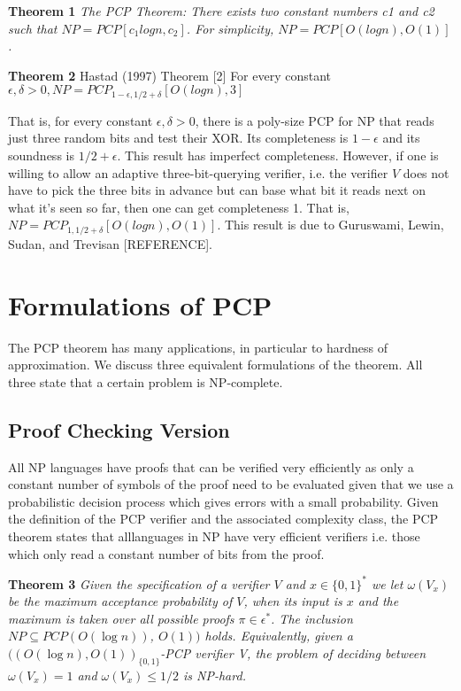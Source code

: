 \textbf{Theorem 1} \textit{The PCP Theorem: There exists two constant numbers c1 and c2 such that $NP = PCP[c_1 log n, c_2]$. For simplicity, $NP = PCP[O(log n), O(1)]$.}

\textbf{Theorem 2} Hastad (1997) Theorem [2] For every constant $\epsilon, \delta > 0, NP = PCP_{1 - \epsilon,1/2+\delta} [O(log n), 3]$ 

That is, for every constant $\epsilon, \delta > 0$, there is a poly-size PCP for NP that reads just three random bits and test their XOR. Its completeness is $1 - \epsilon$ and its soundness is $1/2 + \epsilon$. This result has imperfect completeness. However, if one is willing to allow an adaptive three-bit-querying verifier, i.e. the verifier $V$ does not have to pick the three bits in advance but can base what bit it reads next on what it’s seen so far, then one can get completeness 1. That is, $NP = PCP_{1,1/2+\delta}[O(log n), O(1)]$. This result is due to Guruswami, Lewin,
Sudan, and Trevisan [REFERENCE].


\section{Formulations of PCP}
The PCP theorem has many applications, in particular to hardness of approximation. We discuss three equivalent formulations of the theorem. All three state that a certain problem is NP-complete.

\subsection{Proof Checking Version}
All NP languages have proofs that can be verified very efficiently as only a constant number of symbols of the proof need to be evaluated given that we use a probabilistic decision process which gives errors with a small probability. Given the definition of the PCP verifier and the associated complexity class, the PCP theorem states that alllanguages in NP have very efficient verifiers i.e. those which only read a constant number of bits from the proof.

\textbf{Theorem 3} \textit{Given the specification of a verifier $V$ and $x \in \{0, 1\}^*$ we let $\omega (V_x)$ be the maximum acceptance probability of $V$, when its input is $x$ and the maximum is taken over all possible proofs $\pi \in \epsilon^*$. The inclusion $NP \subseteq PCP(O(\log n))$, $O(1))$ holds. Equivalently, given a $((O(\log n), O(1))_{\{0,1\}}$-PCP verifier V, the problem of deciding between $\omega(V_x) = 1$ and $\omega(V_x) \leq 1/2$ is NP-hard.}

